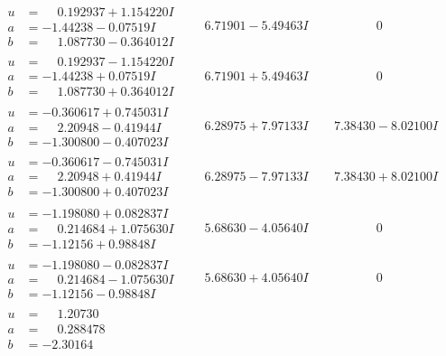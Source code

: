 \documentclass[1p]{elsarticle_modified}
\theoremstyle{definition}
\begin{document}
$$\begin{array}{c|c|c}
\begin{aligned}
u &= \phantom{-}0.192937 + 1.154220 I \\
a &= -1.44238 - 0.07519 I \\
b &= \phantom{-}1.087730 - 0.364012 I\end{aligned}
 & \phantom{-}6.71901 - 5.49463 I & \phantom{-0.000000 } 0 \\ \hline\begin{aligned}
u &= \phantom{-}0.192937 - 1.154220 I \\
a &= -1.44238 + 0.07519 I \\
b &= \phantom{-}1.087730 + 0.364012 I\end{aligned}
 & \phantom{-}6.71901 + 5.49463 I & \phantom{-0.000000 } 0 \\ \hline\begin{aligned}
u &= -0.360617 + 0.745031 I \\
a &= \phantom{-}2.20948 - 0.41944 I \\
b &= -1.300800 - 0.407023 I\end{aligned}
 & \phantom{-}6.28975 + 7.97133 I & \phantom{-}7.38430 - 8.02100 I \\ \hline\begin{aligned}
u &= -0.360617 - 0.745031 I \\
a &= \phantom{-}2.20948 + 0.41944 I \\
b &= -1.300800 + 0.407023 I\end{aligned}
 & \phantom{-}6.28975 - 7.97133 I & \phantom{-}7.38430 + 8.02100 I \\ \hline\begin{aligned}
u &= -1.198080 + 0.082837 I \\
a &= \phantom{-}0.214684 + 1.075630 I \\
b &= -1.12156 + 0.98848 I\end{aligned}
 & \phantom{-}5.68630 - 4.05640 I & \phantom{-0.000000 } 0 \\ \hline\begin{aligned}
u &= -1.198080 - 0.082837 I \\
a &= \phantom{-}0.214684 - 1.075630 I \\
b &= -1.12156 - 0.98848 I\end{aligned}
 & \phantom{-}5.68630 + 4.05640 I & \phantom{-0.000000 } 0 \\ \hline\begin{aligned}
u &= \phantom{-}1.20730\phantom{ +0.000000I} \\
a &= \phantom{-}0.288478\phantom{ +0.000000I} \\
b &= -2.30164\phantom{ +0.000000I}\end{aligned}

\end{array}$$
\end{document}
